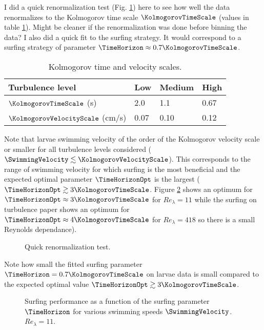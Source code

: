 I did a quick renormalization test (Fig. \ref{fig:renormalization}) here to see how well the data renormalizes to the Kolmogorov time scale $\KolmogorovTimeScale$ (values in table \ref{tab:turbulence_data}).
Might be cleaner if the renormalization was done before binning the data?
I also did a quick fit to the surfing strategy. 
It would correspond to a surfing strategy of parameter $\TimeHorizon \approx 0.7 \KolmogorovTimeScale$.
\begin{table}
	\center
	\begin{tabular}{ l l l l }
		\toprule
		Turbulence level & Low & Medium & High \\
		\midrule
		$\KolmogorovTimeScale$ (s) & 2.0 & 1.1 & 0.67 \\
		$\KolmogorovVelocityScale$ (cm/s) & 0.07 & 0.10 & 0.12 \\
		\bottomrule
	\end{tabular}
	\caption{
		Kolmogorov time and velocity scales.
	}
	\label{tab:turbulence_data}
\end{table}
Note that larvae swimming velocity of the order of the Kolmogorov velocity scale or smaller for all turbulence levels considered ($\SwimmingVelocity \lesssim \KolmogorovVelocityScale$).
This corresponds to the range of swimming velocity for which surfing is the most beneficial and the expected optimal parameter $\TimeHorizonOpt$ is the largest ($\TimeHorizonOpt \gtrsim 3 \KolmogorovTimeScale$. Figure \ref{fig:surfing_parameter_tau_larvae} shows an optimum for $\TimeHorizonOpt \approx 3 \KolmogorovTimeScale$ for $\mathit{Re}_{\lambda} = 11$ while the surfing on turbulence paper shows an optimum for $\TimeHorizonOpt \approx 4 \KolmogorovTimeScale$ for $\mathit{Re}_{\lambda} = 418$ so there is a small Reynolds dependance).
\begin{figure}%
	\centering
	
	\caption{
		Quick renormalization test.
	}
	\label{fig:renormalization}
\end{figure}
Note how small the fitted surfing parameter $\TimeHorizon = 0.7 \KolmogorovTimeScale$ on larvae data is small compared to the expected optimal value $\TimeHorizonOpt \gtrsim 3 \KolmogorovTimeScale$.
\begin{figure}%
	\centering
	
	\caption{
		Surfing performance as a function of the surfing parameter $\TimeHorizon$ for various swimming speeds $\SwimmingVelocity$. $\mathit{Re}_{\lambda} = 11$.
	}
	\label{fig:surfing_parameter_tau_larvae}
\end{figure}
